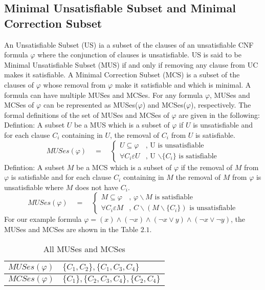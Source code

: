 \subsection{Minimal Unsatisfiable Subset and Minimal Correction Subset }
An Unsatisfiable Subset (US) ia a subset of the clauses of an unsatisfiable CNF formula $\varphi$ where the conjunction of clauses is unsatisfiable. US is said to be Minimal Unsatisfiable Subset (MUS) if and only if removing any clause from UC makes it satisfiable. A Minimal Correction Subset (MCS) is a subset of the clauses of $\varphi$ whose removal from $\varphi$ make it satisfiable and which is minimal. A formula can have multiple MUSes and MCSes. For any formula $\varphi$, MUSes and MCSes of $\varphi$ can be represented as MUSes($\varphi$) and MCSes($\varphi$), respectively. The formal definitions of the set of MUSes and MCSes of $\varphi$ are given in the following:
Defintion:
A subset $U$ be a MUS which is a subset of $\varphi$ if $U$ is unsatisfiable and for each clause $C_{i}$ containing in $U$, the removal of $C_{i}$ from $U$ is satisfiable.
$$MUSes(\varphi)
\quad = \quad 
\left\{
\begin{array}{ll}
{\displaystyle U \subseteq \varphi} 
& 
\text{, U is unsatisfiable }
\\[0.6cm] %
{\displaystyle\forall C_{i} \varepsilon U} & \text{, U $\backslash \{C_{i}\}$ is satisfiable}
\end{array}
\right.$$
Defintion: A subset $M$ be a MCS which is a subset of $\varphi$ if the removal of $M$ from $\varphi$ is satisfiable and for each clause $C_{i}$ containing in $M$ the removal of $M$ from $\varphi$ is unsatisfiable where $M$ does not have $C_{i}$.
$$MUSes(\varphi)
\quad = \quad 
\left\{
\begin{array}{ll}
{\displaystyle M \subseteq \varphi} 
& 
\text{, $\varphi\backslash M$ is satisfiable}
\\[0.6cm] %
{\displaystyle\forall C_{i} \varepsilon M} & \text{, $C\backslash(M\backslash\{C_{i}\})$ is unsatisfiable}
\end{array}
\right.$$
For our example formula $\varphi=(x)\wedge(\neg x)\wedge(\neg x\vee y)\wedge(\neg x \vee \neg y)$, the MUSes and MCSes are shown in the Table $2.1$.
\begin{table}[]
	\centering
	\caption{All MUSes and MCSes}
	\label{my-label}
	\begin{tabular}{|l|l|}
		\hline
		$MUSes(\varphi)$ & $\{C_{1},C_{2}\},\{C_{1},C_{3},C_{4}\}$ \\ \hline
		$MCSes(\varphi)$ & $\{C_{1}\},\{C_{2},C_{3},C_{4}\},\{C_{2},C_{4}\}$ \\ \hline
	\end{tabular}
\end{table}

